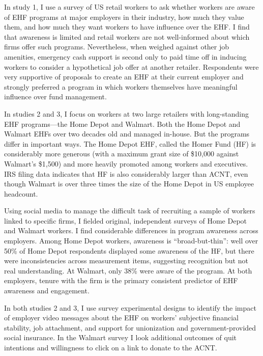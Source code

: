 \documentclass[
  11pt,
  oneside]{article}
\begin{document}
In study 1, I use a survey of US retail workers to ask whether workers are aware of EHF programs at major employers in their industry, how much they value them, and how much they want workers to have influence over the EHF. I find that awareness is limited and retail workers are not well-informed about which firms offer such programs. Nevertheless, when weighed against other job amenities, emergency cash support is second only to paid time off in inducing workers to consider a hypothetical job offer at another retailer. Respondents were very supportive of proposals to create an EHF at their current employer and strongly preferred a program in which workers themselves have meaningful influence over fund management.

In studies 2 and 3, I focus on workers at two large retailers with long-standing EHF programs---the Home Depot and Walmart. Both the Home Depot and Walmart EHFs over two decades old and managed in-house. But the programs differ in important ways. The Home Depot EHF, called the Homer Fund (HF) is considerably more generous (with a maximum grant size of \$10,000 against Walmart's \$1,500) and more heavily promoted among workers and executives. IRS filing data indicates that HF is also considerably larger than ACNT, even though Walmart is over three times the size of the Home Depot in US employee headcount.

Using social media to manage the difficult task of recruiting a sample of workers linked to specific firms, I fielded original, independent surveys of Home Depot and Walmart workers. I find considerable differences in program awareness across employers. Among Home Depot workers, awareness is ``broad-but-thin'': well over 50\% of Home Depot respondents displayed some awareness of the HF, but there were inconsistencies across measurement items, suggesting recognition but not real understanding. At Walmart, only 38\% were aware of the program. At both employers, tenure with the firm is the primary consistent predictor of EHF awareness and engagement.

In both studies 2 and 3, I use survey experimental designs to identify the impact of employer video messages about the EHF on workers' subjective financial stability, job attachment, and support for unionization and government-provided social insurance. In the Walmart survey I look additional outcomes of quit intentions and willingness to click on a link to donate to the ACNT.
\end{document}
